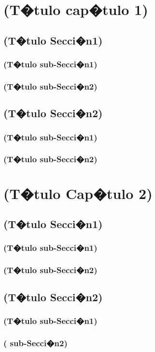 \documentclass{book}
\begin{document}
\tableofcontents
\tableofcontents
\chapter{(T�tulo  cap�tulo 1)}

\section{(T�tulo  Secci�n1)}
\subsection{(T�tulo  sub-Secci�n1)}
\subsection{(T�tulo  sub-Secci�n2)}
\section{(T�tulo  Secci�n2)}
\subsection{(T�tulo  sub-Secci�n1)}
\subsection{(T�tulo  sub-Secci�n2)}

\chapter{(T�tulo  Cap�tulo 2)}

\section{(T�tulo  Secci�n1)}
\subsection{(T�tulo  sub-Secci�n1)}
\subsection{(T�tulo  sub-Secci�n2)}
\section{(T�tulo  Secci�n2)}
\subsection{(T�tulo  sub-Secci�n1)}
\subsection{( sub-Secci�n2)}
\end{document}
